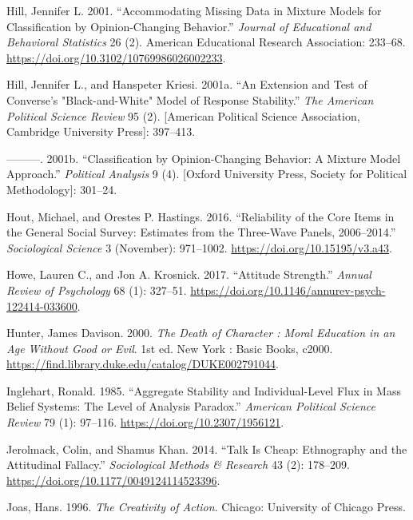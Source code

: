 \documentclass[12pt,]{article}
\begin{document}
\leavevmode\hypertarget{ref-hill2001}{}%
Hill, Jennifer L. 2001. ``Accommodating Missing Data in Mixture Models for Classification by Opinion-Changing Behavior.'' \emph{Journal of Educational and Behavioral Statistics} 26 (2). American Educational Research Association: 233--68. \url{https://doi.org/10.3102/10769986026002233}.

\leavevmode\hypertarget{ref-hill2001a}{}%
Hill, Jennifer L., and Hanspeter Kriesi. 2001a. ``An Extension and Test of Converse's "Black-and-White" Model of Response Stability.'' \emph{The American Political Science Review} 95 (2). {[}American Political Science Association, Cambridge University Press{]}: 397--413.

\leavevmode\hypertarget{ref-hill2001b}{}%
---------. 2001b. ``Classification by Opinion-Changing Behavior: A Mixture Model Approach.'' \emph{Political Analysis} 9 (4). {[}Oxford University Press, Society for Political Methodology{]}: 301--24.

\leavevmode\hypertarget{ref-hout2016}{}%
Hout, Michael, and Orestes P. Hastings. 2016. ``Reliability of the Core Items in the General Social Survey: Estimates from the Three-Wave Panels, 2006--2014.'' \emph{Sociological Science} 3 (November): 971--1002. \url{https://doi.org/10.15195/v3.a43}.

\leavevmode\hypertarget{ref-howe2017}{}%
Howe, Lauren C., and Jon A. Krosnick. 2017. ``Attitude Strength.'' \emph{Annual Review of Psychology} 68 (1): 327--51. \url{https://doi.org/10.1146/annurev-psych-122414-033600}.

\leavevmode\hypertarget{ref-hunter2000}{}%
Hunter, James Davison. 2000. \emph{The Death of Character : Moral Education in an Age Without Good or Evil}. 1st ed. New York : Basic Books, c2000. \url{https://find.library.duke.edu/catalog/DUKE002791044}.

\leavevmode\hypertarget{ref-inglehart1985}{}%
Inglehart, Ronald. 1985. ``Aggregate Stability and Individual-Level Flux in Mass Belief Systems: The Level of Analysis Paradox.'' \emph{American Political Science Review} 79 (1): 97--116. \url{https://doi.org/10.2307/1956121}.

\leavevmode\hypertarget{ref-jerolmack2014}{}%
Jerolmack, Colin, and Shamus Khan. 2014. ``Talk Is Cheap: Ethnography and the Attitudinal Fallacy.'' \emph{Sociological Methods \& Research} 43 (2): 178--209. \url{https://doi.org/10.1177/0049124114523396}.

\leavevmode\hypertarget{ref-joas1996}{}%
Joas, Hans. 1996. \emph{The Creativity of Action}. Chicago: University of Chicago Press.
\end{document}
